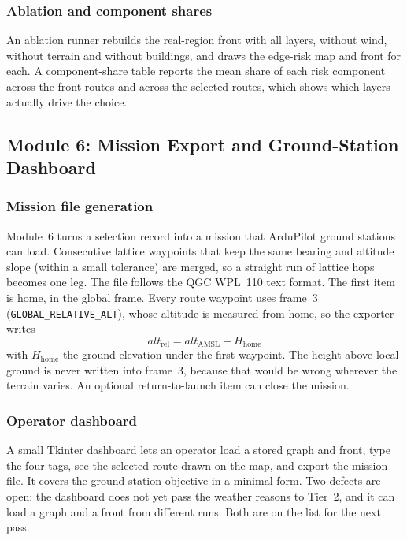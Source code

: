 \documentclass{ssnreview}
\begin{document}
\subsubsection{Ablation and component shares}

An ablation runner rebuilds the real-region front with all layers, without wind, without
terrain and without buildings, and draws the edge-risk map and front for each. A
component-share table reports the mean share of each risk component across the front
routes and across the selected routes, which shows which layers actually drive the
choice.

\subsection{Module 6: Mission Export and Ground-Station Dashboard}\label{sec:m6}

\subsubsection{Mission file generation}

Module~6 turns a selection record into a mission that ArduPilot ground stations can load.
Consecutive lattice waypoints that keep the same bearing and altitude slope (within a
small tolerance) are merged, so a straight run of lattice hops becomes one leg. The file
follows the QGC WPL~110 text format. The first item is home, in the global frame. Every
route waypoint uses frame~3 (\texttt{GLOBAL\_RELATIVE\_ALT}), whose altitude is measured
from home, so the exporter writes
\begin{equation}
  \mathit{alt}_\mathrm{rel} = \mathit{alt}_\mathrm{AMSL} - H_\mathrm{home}
\end{equation}
with $H_\mathrm{home}$ the ground elevation under the first waypoint. The height above
local ground is never written into frame~3, because that would be wrong wherever the
terrain varies. An optional return-to-launch item can
close the mission.

\subsubsection{Operator dashboard}

A small Tkinter dashboard lets an operator load a stored graph and front, type the four
tags, see the selected route drawn on the map, and export the mission file. It covers the
ground-station objective in a minimal form. Two defects are open: the dashboard does not
yet pass the weather reasons to Tier~2, and it can load a graph and a front from different
runs. Both are on the list for the next pass.
\end{document}

